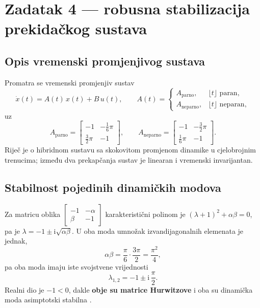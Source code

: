 
\section{Zadatak 4 --- robusna stabilizacija prekidačkog sustava}
\label{sec:zad4}

\subsection{Opis vremenski promjenjivog sustava}
\label{sec:zad4:opis}

Promatra se vremenski promjenjiv sustav \cite[str.~2]{jokic_zadatak}
\begin{equation}
  \dot{x}(t) = A(t)\,x(t) + B\,u(t), \qquad
  A(t) = \begin{cases}
    A_{\text{parno}}, & \lfloor t \rfloor \text{ paran},\\
    A_{\text{neparno}}, & \lfloor t \rfloor \text{ neparan},
  \end{cases}
  \label{eq:z4sys}
\end{equation}
uz
\begin{equation}
  A_{\text{parno}} = \begin{bmatrix} -1 & -\tfrac{1}{6}\pi \\[2pt] \tfrac{3}{2}\pi & -1 \end{bmatrix}, \qquad
  A_{\text{neparno}} = \begin{bmatrix} -1 & -\tfrac{3}{2}\pi \\[2pt] \tfrac{1}{6}\pi & -1 \end{bmatrix}.
\end{equation}
Riječ je o hibridnom sustavu sa skokovitom promjenom dinamike u cjelobrojnim
trenucima; između dva prekapčanja sustav je linearan i vremenski invarijantan.

\subsection{Stabilnost pojedinih dinamičkih modova}
\label{sec:zad4:modovi}

Za matricu oblika $\left[\begin{smallmatrix} -1 & -\alpha \\ \beta & -1 \end{smallmatrix}\right]$
karakteristični polinom je $(\lambda+1)^2 + \alpha\beta = 0$, pa je
$\lambda = -1 \pm \mathrm{i}\sqrt{\alpha\beta}$. U oba moda umnožak
izvandijagonalnih elemenata je jednak,
\begin{equation}
  \alpha\beta = \frac{\pi}{6}\cdot\frac{3\pi}{2} = \frac{\pi^2}{4},
\end{equation}
pa oba moda imaju iste svojstvene vrijednosti
\begin{equation}
  \lambda_{1,2} = -1 \pm \mathrm{i}\,\frac{\pi}{2} .
\end{equation}
Realni dio je $-1 < 0$, dakle \textbf{obje su matrice Hurwitzove} i oba su
dinamička moda asimptotski stabilna \cite[str.~5]{jokic_ljapunov}.

